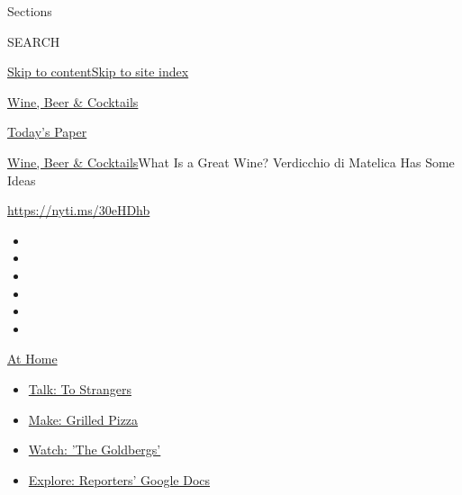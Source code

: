 Sections

SEARCH

\protect\hyperlink{site-content}{Skip to
content}\protect\hyperlink{site-index}{Skip to site index}

\href{https://www.nytimes.com/section/food/drinks}{Wine, Beer \&
Cocktails}

\href{https://myaccount.nytimes.com/auth/login?response_type=cookie\&client_id=vi}{}

\href{https://www.nytimes.com/section/todayspaper}{Today's Paper}

\href{/section/food/drinks}{Wine, Beer \& Cocktails}\textbar{}What Is a
Great Wine? Verdicchio di Matelica Has Some Ideas

\url{https://nyti.ms/30eHDhb}

\begin{itemize}
\item
\item
\item
\item
\item
\item
\end{itemize}

\href{https://www.nytimes.com/spotlight/at-home?action=click\&pgtype=Article\&state=default\&region=TOP_BANNER\&context=at_home_menu}{At
Home}

\begin{itemize}
\tightlist
\item
  \href{https://www.nytimes.com/2020/08/03/well/family/the-benefits-of-talking-to-strangers.html?action=click\&pgtype=Article\&state=default\&region=TOP_BANNER\&context=at_home_menu}{Talk:
  To Strangers}
\item
  \href{https://www.nytimes.com/2020/08/01/at-home/coronavirus-make-pizza-on-a-grill.html?action=click\&pgtype=Article\&state=default\&region=TOP_BANNER\&context=at_home_menu}{Make:
  Grilled Pizza}
\item
  \href{https://www.nytimes.com/2020/07/31/arts/television/goldbergs-abc-stream.html?action=click\&pgtype=Article\&state=default\&region=TOP_BANNER\&context=at_home_menu}{Watch:
  'The Goldbergs'}
\item
  \href{https://www.nytimes.com/interactive/2020/at-home/even-more-reporters-editors-diaries-lists-recommendations.html?action=click\&pgtype=Article\&state=default\&region=TOP_BANNER\&context=at_home_menu}{Explore:
  Reporters' Google Docs}
\end{itemize}

